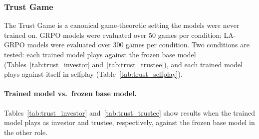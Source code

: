 \documentclass[12pt,a4paper]{article}
\renewcommand{\arraystretch}{1.25}
\begin{document}
\subsubsection{Trust Game}

The Trust Game is a canonical game-theoretic setting the models were never trained on. GRPO models were evaluated over 50 games per condition; LA-GRPO models were evaluated over 300 games per condition. Two conditions are tested: each trained model plays against the frozen base model (Tables~\ref{tab:trust_investor} and~\ref{tab:trust_trustee}), and each trained model plays against itself in selfplay (Table~\ref{tab:trust_selfplay}).

\paragraph{Trained model vs.\ frozen base model.}
Tables~\ref{tab:trust_investor} and~\ref{tab:trust_trustee} show results when the trained model plays as investor and trustee, respectively, against the frozen base model in the other role.

\begin{table}[H]
\centering
\caption[Trust Game results: trained model as Investor.]{Trust Game results: trained model as Investor vs.\ frozen base model as Trustee. Bold indicates best per row.}
\label{tab:trust_investor}
\renewcommand{\arraystretch}{1.15}
\end{table}
\end{document}
